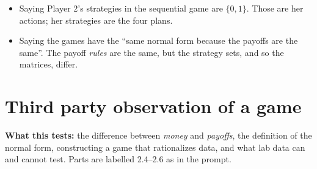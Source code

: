 \documentclass[11pt]{article}
\begin{document}
\begin{pitfall}
\begin{itemize}
\item Saying Player 2's strategies in the sequential game are $\{0,1\}$. Those are her actions; her strategies are the four plans.
\item Saying the games have the ``same normal form because the payoffs are the same''. The payoff \emph{rules} are the same, but the strategy sets, and so the matrices, differ.
\end{itemize}
\end{pitfall}

\section{Third party observation of a game}

\textbf{What this tests:} the difference between \emph{money} and \emph{payoffs}, the definition of the normal form, constructing a game that rationalizes data, and what lab data can and cannot test. Parts are labelled 2.4--2.6 as in the prompt.
\end{document}

